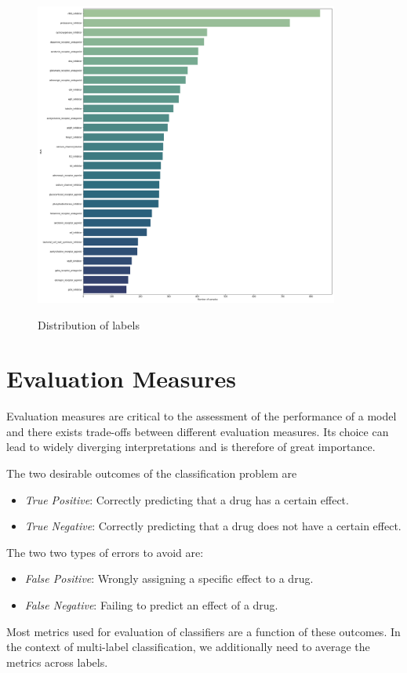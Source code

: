 \documentclass[bsc,frontabs,twoside,singlespacing,parskip,deptreport]{infthesis}     %
\let\Oldsection\section
\renewcommand{\section}{\FloatBarrier\Oldsection}
\begin{document}
\begin{figure}[h!]
\centering
\caption{Distribution of labels}
\includegraphics[height=10cm]{images/label_dist.png}\label{label_dist}
\end{figure}
\section{Evaluation Measures}
Evaluation measures are critical to the assessment of the performance of a model and there exists trade-offs between different evaluation measures. Its choice can lead to widely diverging interpretations and is therefore of great importance.

The two desirable outcomes of the classification problem are 
\begin{itemize}
    \item \textit{True Positive}: Correctly predicting that a drug has a certain effect.
    \item \textit{True Negative}: Correctly predicting that a drug does not have a certain effect.
\end{itemize}

The two two types of errors to avoid are:
\begin{itemize}
    \item \textit{False Positive}: Wrongly assigning a specific effect to a drug.
    \item \textit{False Negative}: Failing to predict an effect of a drug.
\end{itemize}

Most metrics used for evaluation of classifiers are a function of these outcomes. In the context of multi-label classification, we additionally need to average the metrics across labels.
\end{document}
